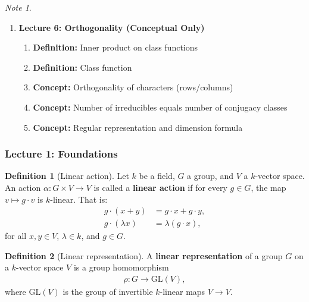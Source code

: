 \documentclass[titlepage]{article}
\theoremstyle{plain}
\theoremstyle{definition}
\newtheorem{definition}{Definition}[section]
\theoremstyle{remark}
\newtheorem{note}{Note}
\theoremstyle{exercise-style}
\numberwithin{equation}{section}
\numberwithin{theorem}{section}
\numberwithin{remark}{section}
\begin{document}
\begin{myboxr}
\begin{note}
\begin{enumerate}
            \item \textbf{Lecture 6: Orthogonality (Conceptual Only)}
            \begin{enumerate}
                \item \textbf{Definition:} Inner product on class functions
                \item \textbf{Definition:} Class function
                \item \textbf{Concept:} Orthogonality of characters (rows/columns)
                \item \textbf{Concept:} Number of irreducibles equals number of conjugacy classes
                \item \textbf{Concept:} Regular representation and dimension formula
            \end{enumerate}
        \end{enumerate}
    \end{note}
\end{myboxr}

\subsubsection{Lecture 1: Foundations}


\begin{definition}[Linear action]
    Let $k$ be a field, $G$ a group, and $V$ a $k$-vector space. An action $\alpha: G \times V \to V$ is called a \textbf{linear action} if for every $g \in G$, the map $v \mapsto g \cdot v$ is $k$-linear. That is:
    \begin{align}
        g \cdot (x + y) &= g \cdot x + g \cdot y, \\
        g \cdot (\lambda x) &= \lambda (g \cdot x),
    \end{align}
    for all $x,y \in V$, $\lambda \in k$, and $g \in G$.
\end{definition}

\begin{definition}[Linear representation]
    A \textbf{linear representation} of a group $G$ on a $k$-vector space $V$ is a group homomorphism
    \begin{align}
        \rho: G \to \mathrm{GL}(V),
    \end{align}
    where $\mathrm{GL}(V)$ is the group of invertible $k$-linear maps $V \to V$.
\end{definition}
\end{document}
